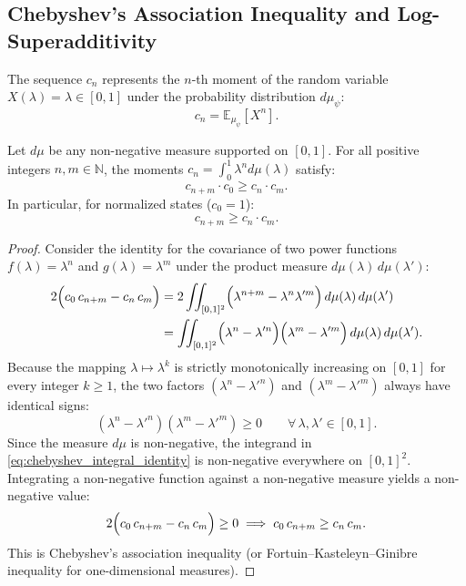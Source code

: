 \subsection{Chebyshev's Association Inequality and Log-Superadditivity}
\label{subsec:chebyshev_superadditivity}

The sequence $c_n$ represents the $n$-th moment of the random variable $X(\lambda) = \lambda \in [0, 1]$ under the probability distribution $d\mu_\psi$:
\begin{equation}
c_n = \mathbb{E}_{\mu_\psi}[X^n].
\end{equation}

\begin{lemma}
\label{lem:log_superadditivity_moments}
Let $d\mu$ be any non-negative measure supported on $[0, 1]$. For all positive integers $n, m \in \mathbb{N}$, the moments $c_n = \int_0^1 \lambda^n d\mu(\lambda)$ satisfy:
\begin{equation}
\label{eq:supermultiplicative_inequality}
c_{n+m} \cdot c_0 \ge c_n \cdot c_m.
\end{equation}
In particular, for normalized states ($c_0 = 1$):
\begin{equation}
\label{eq:normalized_supermultiplicative}
c_{n+m} \ge c_n \cdot c_m.
\end{equation}
\end{lemma}

\begin{proof}
Consider the identity for the covariance of two power functions $f(\lambda) = \lambda^n$ and $g(\lambda) = \lambda^m$ under the product measure $d\mu(\lambda) \, d\mu(\lambda')$:
\begin{align}
\label{eq:chebyshev_integral_identity}
2 \Bigl( c_0 \, c_{n+m} - c_n \, c_m \Bigr) &= 2 \iint_{[0, 1]^2} \Bigl( \lambda^{n+m} - \lambda^n \lambda'^m \Bigr) \, d\mu(\lambda) \, d\mu(\lambda') \nonumber \\
&= \iint_{[0, 1]^2} \Bigl( \lambda^n - \lambda'^n \Bigr) \Bigl( \lambda^m - \lambda'^m \Bigr) \, d\mu(\lambda) \, d\mu(\lambda').
\end{align}
Because the mapping $\lambda \mapsto \lambda^k$ is strictly monotonically increasing on $[0, 1]$ for every integer $k \ge 1$, the two factors $(\lambda^n - \lambda'^n)$ and $(\lambda^m - \lambda'^m)$ always have identical signs:
\begin{equation}
(\lambda^n - \lambda'^n)(\lambda^m - \lambda'^m) \ge 0 \qquad \forall \, \lambda, \lambda' \in [0, 1].
\end{equation}
Since the measure $d\mu$ is non-negative, the integrand in \eqref{eq:chebyshev_integral_identity} is non-negative everywhere on $[0, 1]^2$. Integrating a non-negative function against a non-negative measure yields a non-negative value:
\begin{equation}
2 \Bigl( c_0 \, c_{n+m} - c_n \, c_m \Bigr) \ge 0 \implies c_0 \, c_{n+m} \ge c_n \, c_m.
\end{equation}
This is Chebyshev's association inequality (or Fortuin--Kasteleyn--Ginibre inequality for one-dimensional measures).
\end{proof}

